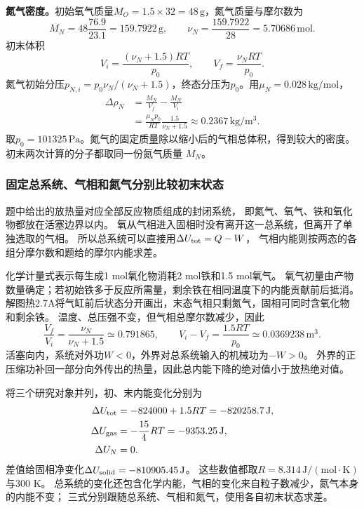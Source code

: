 \documentclass[UTF8,fontset=fandol,a4paper,11pt]{ctexart}
\begin{document}
\textbf{氮气密度。}初始氧气质量$M_O=1.5\times32=48\,\mathrm g$，氮气质量与摩尔数为
\[M_N=48\frac{76.9}{23.1}=159.7922\,\mathrm g,\qquad
\nu_N=\frac{159.7922}{28}=5.70686\,\mathrm{mol}.\]
初末体积
\[V_i=\frac{(\nu_N+1.5)RT}{p_0},\qquad V_f=\frac{\nu_NRT}{p_0}.\]
氮气初始分压$p_{N,i}=p_0\nu_N/(\nu_N+1.5)$，终态分压为$p_0$。用$\mu_N=0.028\,\mathrm{kg/mol}$，
\[\begin{aligned}
\Delta\rho_N&=\frac{M_N}{V_f}-\frac{M_N}{V_i}\\
&=\frac{\mu_Np_0}{RT}\frac{1.5}{\nu_N+1.5}
\approx0.2367\,\mathrm{kg/m^3}.
\end{aligned}\]
取$p_0=101325\,\mathrm{Pa}$。氮气的固定质量除以缩小后的气相总体积，得到较大的密度。初末两次计算的分子都取同一份氮气质量 $M_N$。
\subsubsection*{固定总系统、气相和氮气分别比较初末状态}
题中给出的放热量对应全部反应物质组成的封闭系统，
即氮气、氧气、铁和氧化物都放在活塞边界以内。
氧从气相进入固相时没有离开这一总系统，但离开了单独选取的气相。
所以总系统可以直接用$\Delta U_{\rm tot}=Q-W$，
气相内能则按两态的各组分摩尔数和题给的摩尔内能求差。

化学计量式表示每生成1 mol氧化物消耗2 mol铁和1.5 mol氧气。
氧气初量由产物数量确定；若初始铁多于反应所需量，剩余铁在相同温度下的内能贡献前后抵消。
解图热2.7A将气缸前后状态分开画出，末态气相只剩氮气，固相可同时含氧化物和剩余铁。
温度、总压强不变，但气相总摩尔数减少，因此
\[
\frac{V_f}{V_i}=\frac{\nu_N}{\nu_N+1.5}\simeq0.791865,\qquad
V_i-V_f=\frac{1.5RT}{p_0}\simeq0.0369238\,\mathrm{m^3}.
\]
活塞向内，系统对外功$W<0$，外界对总系统输入的机械功为$-W>0$。
外界的正压缩功补回一部分向外传出的热量，因此总内能下降的绝对值小于放热绝对值。

将三个研究对象并列，初、末内能变化分别为
\[
\begin{aligned}
\Delta U_{\rm tot}&=-824000+1.5RT=-820258.7\,\mathrm J,\\
\Delta U_{\rm gas}&=-\frac{15}{4}RT=-9353.25\,\mathrm J,\\
\Delta U_N&=0.
\end{aligned}
\]
差值给固相净变化$\Delta U_{\rm solid}=-810905.45\,\mathrm J$。
这些数值都取$R=8.314\,\mathrm{J/(mol\cdot K)}$与300 K。
总系统的变化还包含化学内能，气相的变化来自粒子数减少，氮气本身的内能不变；
三式分别跟随总系统、气相和氮气，使用各自初末状态求差。
\end{document}
